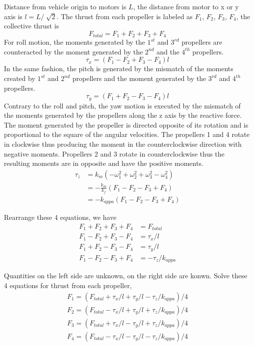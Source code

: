 \documentclass[letterpaper]{article}
\begin{document}
Distance from vehicle origin to motors is $L$, the distance from motor to x or y axis is $ l = L/\sqrt[]{2}$. The thrust from each propeller is labeled as $F_1$, $F_2$, $F_3$, $F_4$, the collective thrust is
$$ F_{total} = F_1 + F_2 + F_3 + F_4 $$
For roll motion, the moments generated by the $1^{st}$ and $3^{rd}$ propellers are counteracted by the moment generated by the $2^{nd}$ and the $4^{th}$ propellers. 
$$ \tau_x = (F_1 - F_2 + F_3 - F_4)l $$
In the same fashion, the pitch is generated by the mismatch of the moments created by $1^{st}$ and $2^{nd}$ propellers and the moment generated by the $3^{rd}$ and $4^{th}$ propellers.
$$ \tau_y = (F_1 + F_2 - F_3 - F_4)l $$
Contrary to the roll and pitch, the yaw motion is executed by the mismatch of the moments generated by the propellers along the z axis by the reactive force. The moment generated by the propeller is directed opposite of its rotation and is proportional to the square of the angular velocities. The propellers 1 and 4 rotate in clockwise thus producing the moment in the counterclockwise direction with negative moments. Propellers 2 and 3 rotate in counterclockwise thus the resulting moments are in opposite and have the positive moments.
\begin{align*}
\tau_z &= k_m (-\omega^2_1 + \omega^2_2 + \omega^2_3 - \omega^2_4) \\
       &= -\frac{k_m}{k_f} (F_1 - F_2 - F_3 + F_4) \\
       &= -k_{appa}  (F_1 - F_2 - F_3 + F_4)
\end{align*}

Rearrange these 4 equations, we have
\begin{align*}
F_1 + F_2 + F_3 + F_4 &= F_{total}  \\
F_1 - F_2 + F_3 - F_4 &= \tau_x / l \\
F_1 + F_2 - F_3 - F_4 &= \tau_y / l \\
F_1 - F_2 - F_3 + F_4 &= -\tau_z / k_{appa}
\end{align*}

Quantities on the left side are unknown, on the right side are konwn. Solve these 4 equations for thrust from each propeller,
\begin{align*}
F_1 = (F_{total} + \tau_x / l + \tau_y / l  -\tau_z / k_{appa})/4  \\
F_2 = (F_{total} - \tau_x / l + \tau_y / l  +\tau_z / k_{appa})/4 \\
F_3 = (F_{total} + \tau_x / l - \tau_y / l  +\tau_z / k_{appa})/4 \\
F_4 = (F_{total} - \tau_x / l - \tau_y / l  -\tau_z / k_{appa})/4
\end{align*}
\end{document}
